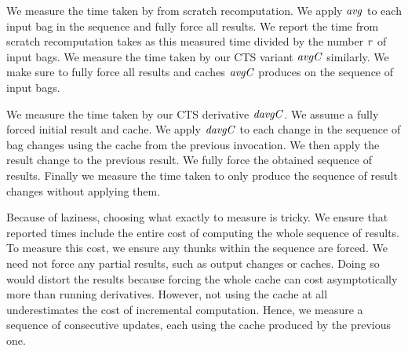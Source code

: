 We measure the time taken by from scratch recomputation. We apply \ensuremath{\Varid{avg}} to
each input bag in the sequence and fully force all results. We report the time
from scratch recomputation takes as this measured time divided by the number \ensuremath{\Varid{r}}
of input bags. We measure the time taken by our CTS variant \ensuremath{\Varid{avgC}} similarly.
We make sure to fully force all results and caches \ensuremath{\Varid{avgC}} produces on the sequence
of input bags.

We measure the time taken by our CTS derivative \ensuremath{\Varid{davgC}}. We assume a fully
forced initial result and cache. We apply \ensuremath{\Varid{davgC}} to each change in the
sequence of bag changes using the cache from the previous invocation. We then
apply the result change to the previous result. We fully force the obtained
sequence of results. Finally we measure the time taken to only produce the sequence
of result changes without applying them.

Because of laziness, choosing what exactly to measure is tricky.
We ensure that reported times include the entire cost of computing the whole
sequence of results. To measure this cost, we ensure any thunks within the
sequence are forced. We need not force any partial results, such as output
changes or caches. Doing so would distort the results because forcing the whole
cache can cost asymptotically more than running derivatives. However, not using
the cache at all underestimates the cost of incremental computation. Hence, we
measure a sequence of consecutive updates, each using the cache produced by the
previous one.

